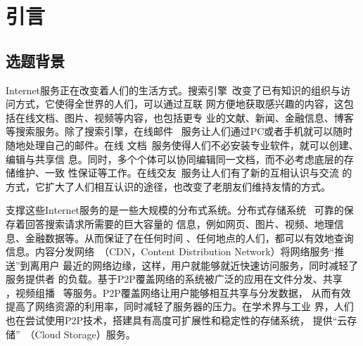 \chapter{引言}
\label{chap:intro}




\section{选题背景}




Internet服务正在改变着人们的生活方式。搜索引擎~\cite{google, yahoo,
baidu}改变了已有知识的组织与访问方式，它使得全世界的人们，可以通过互联
网方便地获取感兴趣的内容，这包括在线文档、图片、视频等内容，也包括更专
业的文献、新闻、金融信息、博客等搜索服务。除了搜索引擎，在线邮件~
\cite{gmail}服务让人们通过PC或者手机就可以随时随地处理自己的邮件。在线
文档~\cite{gdoc}服务使得人们不必安装专业软件，就可以创建、编辑与共享信
息。同时，多个个体可以协同编辑同一文档，而不必考虑底层的存储维护、一致
性保证等工作。在线交友~\cite{facebook}服务让人们有了新的互相认识与交流
的方式，它扩大了人们相互认识的途径，也改变了老朋友们维持友情的方式。


支撑这些Internet服务的是一些大规模的分布式系统。分布式存储系统~
\cite{gfs, bigtable, dynamo}可靠的保存着回答搜索请求所需要的巨大容量的
信息，例如网页、图片、视频、地理信息、金融数据等。从而保证了在任何时间
、任何地点的人们，都可以有效地查询信息。内容分发网络~\cite{akamai,
coral}（CDN，Content Distribution Network）将网络服务“推送”到离用户
最近的网络边缘，这样，用户就能够就近快速访问服务，同时减轻了服务提供者
的负载。基于P2P覆盖网络的系统被广泛的应用在文件分发、共享~
\cite{bittorrent, sharkfs}，视频组播~ \cite{chainsaw, coolstreaming,
bullet, splitstream}等服务。P2P覆盖网络让用户能够相互共享与分发数据，
从而有效提高了网络资源的利用率，同时减轻了服务器的压力。在学术界与工业
界，人们也在尝试使用P2P技术，搭建具有高度可扩展性和稳定性的存储系统，
提供“云存储”~\cite{s3, idisk}（Cloud Storage）服务。


